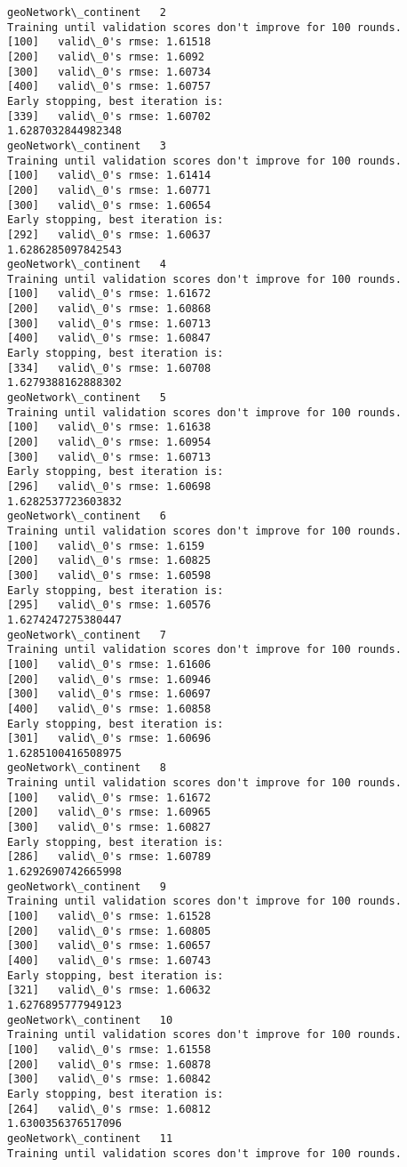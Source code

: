 \documentclass[11pt]{article}
\begin{document}
\begin{Verbatim}[commandchars=\\\{\}]
geoNetwork\_continent   2
Training until validation scores don't improve for 100 rounds.
[100]	valid\_0's rmse: 1.61518
[200]	valid\_0's rmse: 1.6092
[300]	valid\_0's rmse: 1.60734
[400]	valid\_0's rmse: 1.60757
Early stopping, best iteration is:
[339]	valid\_0's rmse: 1.60702
1.6287032844982348
geoNetwork\_continent   3
Training until validation scores don't improve for 100 rounds.
[100]	valid\_0's rmse: 1.61414
[200]	valid\_0's rmse: 1.60771
[300]	valid\_0's rmse: 1.60654
Early stopping, best iteration is:
[292]	valid\_0's rmse: 1.60637
1.6286285097842543
geoNetwork\_continent   4
Training until validation scores don't improve for 100 rounds.
[100]	valid\_0's rmse: 1.61672
[200]	valid\_0's rmse: 1.60868
[300]	valid\_0's rmse: 1.60713
[400]	valid\_0's rmse: 1.60847
Early stopping, best iteration is:
[334]	valid\_0's rmse: 1.60708
1.6279388162888302
geoNetwork\_continent   5
Training until validation scores don't improve for 100 rounds.
[100]	valid\_0's rmse: 1.61638
[200]	valid\_0's rmse: 1.60954
[300]	valid\_0's rmse: 1.60713
Early stopping, best iteration is:
[296]	valid\_0's rmse: 1.60698
1.6282537723603832
geoNetwork\_continent   6
Training until validation scores don't improve for 100 rounds.
[100]	valid\_0's rmse: 1.6159
[200]	valid\_0's rmse: 1.60825
[300]	valid\_0's rmse: 1.60598
Early stopping, best iteration is:
[295]	valid\_0's rmse: 1.60576
1.6274247275380447
geoNetwork\_continent   7
Training until validation scores don't improve for 100 rounds.
[100]	valid\_0's rmse: 1.61606
[200]	valid\_0's rmse: 1.60946
[300]	valid\_0's rmse: 1.60697
[400]	valid\_0's rmse: 1.60858
Early stopping, best iteration is:
[301]	valid\_0's rmse: 1.60696
1.6285100416508975
geoNetwork\_continent   8
Training until validation scores don't improve for 100 rounds.
[100]	valid\_0's rmse: 1.61672
[200]	valid\_0's rmse: 1.60965
[300]	valid\_0's rmse: 1.60827
Early stopping, best iteration is:
[286]	valid\_0's rmse: 1.60789
1.6292690742665998
geoNetwork\_continent   9
Training until validation scores don't improve for 100 rounds.
[100]	valid\_0's rmse: 1.61528
[200]	valid\_0's rmse: 1.60805
[300]	valid\_0's rmse: 1.60657
[400]	valid\_0's rmse: 1.60743
Early stopping, best iteration is:
[321]	valid\_0's rmse: 1.60632
1.6276895777949123
geoNetwork\_continent   10
Training until validation scores don't improve for 100 rounds.
[100]	valid\_0's rmse: 1.61558
[200]	valid\_0's rmse: 1.60878
[300]	valid\_0's rmse: 1.60842
Early stopping, best iteration is:
[264]	valid\_0's rmse: 1.60812
1.6300356376517096
geoNetwork\_continent   11
Training until validation scores don't improve for 100 rounds.

\end{Verbatim}
\end{document}
